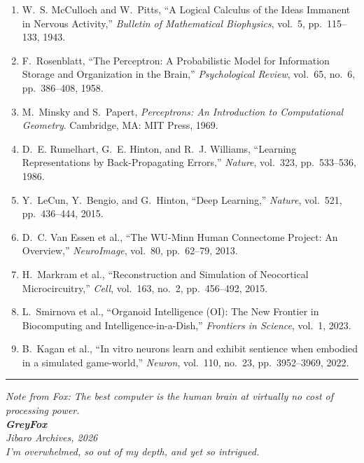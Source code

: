 \documentclass[11pt,a4paper]{article}
\begin{document}
\begin{enumerate}
\setlength{\itemsep}{0.35em}

\item W.~S. McCulloch and W.~Pitts, ``A Logical Calculus of the Ideas Immanent in Nervous Activity,'' \textit{Bulletin of Mathematical Biophysics}, vol.~5, pp.~115--133, 1943.

\item F.~Rosenblatt, ``The Perceptron: A Probabilistic Model for Information Storage and Organization in the Brain,'' \textit{Psychological Review}, vol.~65, no.~6, pp.~386--408, 1958.

\item M.~Minsky and S.~Papert, \textit{Perceptrons: An Introduction to Computational Geometry}. Cambridge, MA: MIT Press, 1969.

\item D.~E. Rumelhart, G.~E. Hinton, and R.~J. Williams, ``Learning Representations by Back-Propagating Errors,'' \textit{Nature}, vol.~323, pp.~533--536, 1986.

\item Y.~LeCun, Y.~Bengio, and G.~Hinton, ``Deep Learning,'' \textit{Nature}, vol.~521, pp.~436--444, 2015.

\item D.~C. Van Essen et al., ``The WU-Minn Human Connectome Project: An Overview,'' \textit{NeuroImage}, vol.~80, pp.~62--79, 2013.

\item H.~Markram et al., ``Reconstruction and Simulation of Neocortical Microcircuitry,'' \textit{Cell}, vol.~163, no.~2, pp.~456--492, 2015.

\item L.~Smirnova et al., ``Organoid Intelligence (OI): The New Frontier in Biocomputing and Intelligence-in-a-Dish,'' \textit{Frontiers in Science}, vol.~1, 2023.

\item B.~Kagan et al., ``In vitro neurons learn and exhibit sentience when embodied in a simulated game-world,'' \textit{Neuron}, vol.~110, no.~23, pp.~3952--3969, 2022.

\end{enumerate}

\vspace{0.6em}
\noindent\rule{\textwidth}{0.4pt}

\begin{center}
\itshape Note from Fox: The best computer is the human brain at virtually no cost of processing power.\\[0.6em]
\upshape\textbf{GreyFox}\\[0.3em]
\itshape Jibaro Archives, 2026\\[0.5em]
\itshape\color{gray!50!black} I'm overwhelmed, so out of my depth, and yet so intrigued.
\end{center}
\end{document}
